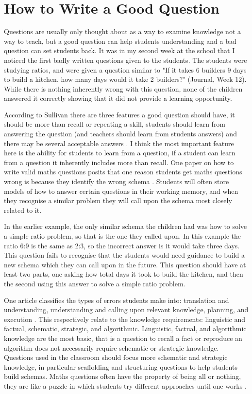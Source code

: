 \documentclass[11pt, a4paper, notitlepage]{article}
\begin{document}
\section*{How to Write a Good Question}
Questions are usually only thought about as a way to examine knowledge not a way to teach, but a good question can help students understanding and a bad question can set students back. It was in my second week at the school that I noticed the first badly written questions given to the students. The students were studying ratios, and were given a question similar to "If it takes 6 builders 9 days to build a kitchen, how many days would it take 2 builders?" (Journal, Week 12). While there is nothing inherently wrong with this question, none of the children answered it correctly showing that it did not provide a learning opportunity.
\par
According to Sullivan there are three features a good question should have, it should be more than recall or repeating a skill, students should learn from answering the question (and teachers should learn from students answers) and there may be several acceptable answers \cite{Sullivan:1997}. I think the most important feature here is the ability for students to learn from a question, if a student can learn from a question it inherently includes more than recall. One paper on how to write valid maths questions posits that one reason students get maths questions wrong is because they identify the wrong schema \cite{Pollitt:2002}. Students will often store models of how to answer certain questions in their working memory, and when they recognise a similar problem they will call upon the schema most closely related to it. 
\par
In the earlier example, the only similar schema the children had was how to solve a simple ratio problem, so that is the one they called upon. In this example the ratio 6:9 is the same as 2:3, so the incorrect answer is it would take three days. This question fails to recognise that the students would need guidance to build a new schema which they can call upon in the future. This question should have at least two parts, one asking how total days it took to build the kitchen, and then the second using this answer to solve a simple ratio problem.
\par
One article classifies the types of errors students make into: translation and understanding, understanding and calling upon relevant knowledge, planning, and execution \cite{Fisher:1996}. This respectively relate to the knowledge requirements: linguistic and factual, schematic, strategic, and algorithmic. Linguistic, factual, and algorithmic knowledge are the most basic, that is a question to recall a fact or reproduce an algorithm does not necessarily require schematic or strategic knowledge. Questions used in the classroom should focus more schematic and strategic knowledge, in particular scaffolding and structuring questions to help students build schemas. Maths questions often have the property of being all or nothing, they are like a puzzle in which students try different approaches until one works \cite{Pollitt:2002}. 
\end{document}
